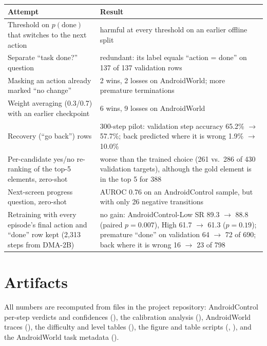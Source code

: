 \documentclass{article}
\newcommand{\ours}{DMA-2B}
\begin{document}
\begin{table}[h]
\centering
\small
\begin{tabular}{@{}L{5.0cm} L{10.5cm}@{}}
\toprule
Attempt & Result \\
\midrule
Threshold on $p(\text{done})$ that switches to the next action & harmful at every threshold on an earlier offline split \\
Separate ``task done?'' question & redundant: its label equals ``action = done'' on 137 of 137 validation rows \\
Masking an action already marked ``no change'' & 2 wins, 2 losses on AndroidWorld; more premature terminations \\
Weight averaging (0.3/0.7) with an earlier checkpoint & 6 wins, 9 losses on AndroidWorld \\
Recovery (``go back'') rows & 300-step pilot: validation step accuracy 65.2\% $\rightarrow$ 57.7\%; back predicted where it is wrong 1.9\% $\rightarrow$ 10.0\% \\
Per-candidate yes/no re-ranking of the top-5 elements, zero-shot & worse than the trained choice (261 vs.\ 286 of 430 validation targets), although the gold element is in the top 5 for 388 \\
Next-screen progress question, zero-shot & AUROC 0.76 on an AndroidControl sample, but with only 26 negative transitions \\
Retraining with every episode's final action and ``done'' row kept (2,313 steps from \ours) & no gain: AndroidControl-Low SR 89.3 $\rightarrow$ 88.8 (paired $p = 0.007$), High 61.7 $\rightarrow$ 61.3 ($p = 0.19$); premature ``done'' on validation 64 $\rightarrow$ 72 of 690; back where it is wrong 16 $\rightarrow$ 23 of 798 \\
\bottomrule
\end{tabular}
\end{table}

\section{Artifacts}
All numbers are recomputed from files in the project repository: AndroidControl per-step verdicts and
confidences (), the calibration analysis
(), AndroidWorld traces (),
the difficulty and level tables (), the figure and table scripts
(, ), and the AndroidWorld task metadata
().
\end{document}

